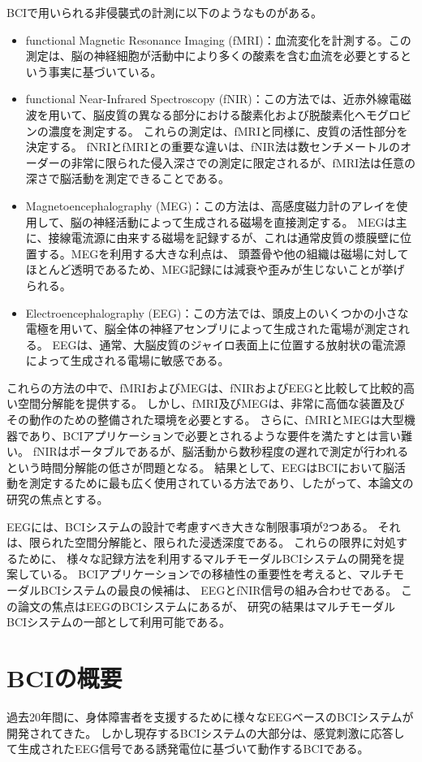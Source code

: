 BCIで用いられる非侵襲式の計測に以下のようなものがある。
\begin{itemize}
    \item functional Magnetic Resonance Imaging (fMRI)：血流変化を計測する。この測定は、脳の神経細胞が活動中により多くの酸素を含む血流を必要とするという事実に基づいている。
    \item functional Near-Infrared Spectroscopy (fNIR)：この方法では、近赤外線電磁波を用いて、脳皮質の異なる部分における酸素化および脱酸素化ヘモグロビンの濃度を測定する。
    これらの測定は、fMRIと同様に、皮質の活性部分を決定する。 
    fNRIとfMRIとの重要な違いは、fNIR法は数センチメートルのオーダーの非常に限られた侵入深さでの測定に限定されるが、fMRI法は任意の深さで脳活動を測定できることである。
    \item Magnetoencephalography (MEG)：この方法は、高感度磁力計のアレイを使用して、脳の神経活動によって生成される磁場を直接測定する。
    MEGは主に、接線電流源に由来する磁場を記録するが、これは通常皮質の漿膜壁に位置する。MEGを利用する大きな利点は、
    頭蓋骨や他の組織は磁場に対してほとんど透明であるため、MEG記録には減衰や歪みが生じないことが挙げられる。
    \item Electroencephalography (EEG)：この方法では、頭皮上のいくつかの小さな電極を用いて、脳全体の神経アセンブリによって生成された電場が測定される。
    EEGは、通常、大脳皮質のジャイロ表面上に位置する放射状の電流源によって生成される電場に敏感である。
\end{itemize}
これらの方法の中で、fMRIおよびMEGは、fNIRおよびEEGと比較して比較的高い空間分解能を提供する。
しかし、fMRI及びMEGは、非常に高価な装置及びその動作のための整備された環境を必要とする。
さらに、fMRIとMEGは大型機器であり、BCIアプリケーションで必要とされるような要件を満たすとは言い難い。
fNIRはポータブルであるが、脳活動から数秒程度の遅れで測定が行われるという時間分解能の低さが問題となる。
結果として、EEGはBCIにおいて脳活動を測定するために最も広く使用されている方法であり、したがって、本論文の研究の焦点とする。

EEGには、BCIシステムの設計で考慮すべき大きな制限事項が2つある。
それは、限られた空間分解能と、限られた浸透深度である。
これらの限界に対処するために、
様々な記録方法を利用するマルチモーダルBCIシステムの開発を提案している。
BCIアプリケーションでの移植性の重要性を考えると、マルチモーダルBCIシステムの最良の候補は、
EEGとfNIR信号の組み合わせである。
この論文の焦点はEEGのBCIシステムにあるが、
研究の結果はマルチモーダルBCIシステムの一部として利用可能である。

\section{BCIの概要}
過去20年間に、身体障害者を支援するために様々なEEGベースのBCIシステムが開発されてきた。
しかし現存するBCIシステムの大部分は、感覚刺激に応答して生成されたEEG信号である誘発電位に基づいて動作するBCIである。
